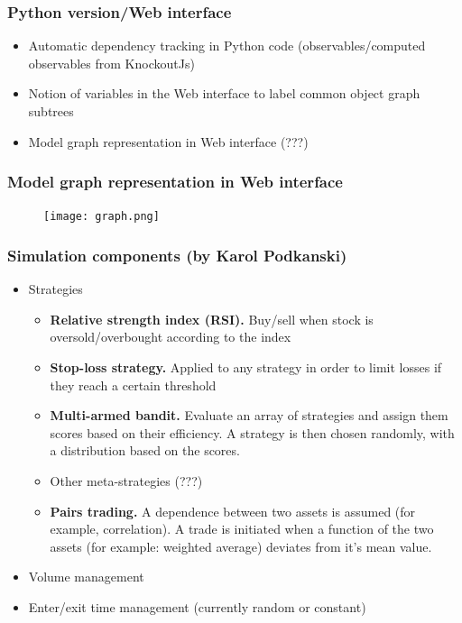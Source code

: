 \documentclass{beamer}
\begin{document}
\begin{frame}
\frametitle{Python version/Web interface}
\begin{itemize}
  \item Automatic dependency tracking in Python code (observables/computed observables from KnockoutJs)
  \item Notion of variables in the Web interface to label common object graph subtrees
  \item Model graph representation in Web interface (???)
\end{itemize}
\end{frame}

\begin{frame}
\frametitle{Model graph representation in Web interface}
\begin{figure}[htbp]
\centering
\texttt{[image: graph.png]}
\end{figure}
\end{frame}

\begin{frame}
\frametitle{Simulation components (by Karol Podkanski)}
\begin{itemize}
    \item Strategies
    \begin{itemize}
      \item \textbf{Relative strength index (RSI).} Buy/sell when stock is oversold/overbought according to the index
      \item \textbf{Stop-loss strategy.} Applied to any strategy in order to limit losses if they reach a certain threshold
      \item \textbf{Multi-armed bandit.} Evaluate an array of strategies and assign them scores based on their efficiency. A strategy is then chosen randomly, with a distribution based on the scores.
      \item Other meta-strategies (???)
      \item \textbf{Pairs trading.} A dependence between two assets is assumed (for example, correlation). A trade is initiated when a function of the two assets (for example: weighted average) deviates from it's mean value.
    \end{itemize}
    \item Volume management
    \item Enter/exit time management  (currently random or constant)
\end{itemize}
\end{frame}
\end{document}
